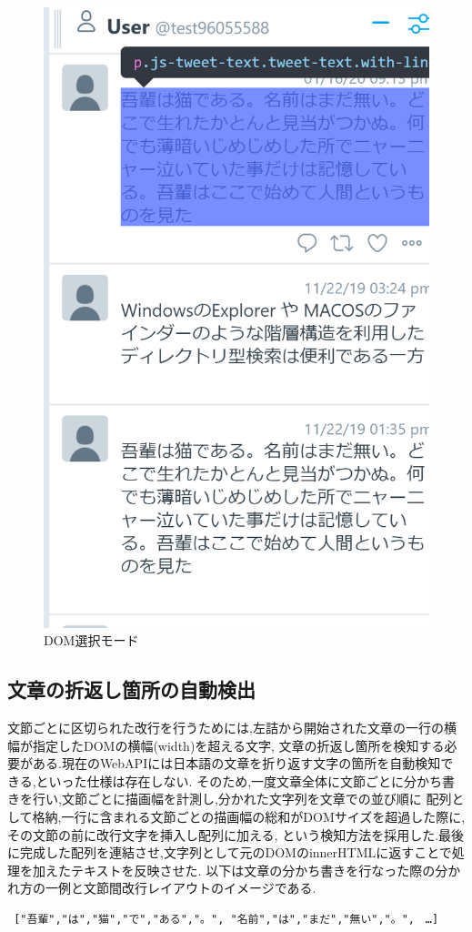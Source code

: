 \begin{figure}[H]
    \centering
    \label{fig:image10}
    \includegraphics[width=0.7\columnwidth]{image/03/img1.png}
    \caption[DOM選択モード] {DOM選択モード}
\end{figure}

\subsection{文章の折返し箇所の自動検出}
文節ごとに区切られた改行を行うためには,左詰から開始された文章の一行の横幅が指定したDOMの横幅(width)を超える文字,
文章の折返し箇所を検知する必要がある.現在のWebAPIには日本語の文章を折り返す文字の箇所を自動検知できる,といった仕様は存在しない.
そのため,一度文章全体に文節ごとに分かち書きを行い,文節ごとに描画幅を計測し,分かれた文字列を文章での並び順に
配列として格納,一行に含まれる文節ごとの描画幅の総和がDOMサイズを超過した際に,その文節の前に改行文字を挿入し配列に加える,
という検知方法を採用した.最後に完成した配列を連結させ,文字列として元のDOMのinnerHTMLに返すことで処理を加えたテキストを反映させた.
以下は文章の分かち書きを行なった際の分かれ方の一例と文節間改行レイアウトのイメージである.

\begin{verbatim} ["吾輩","は","猫","で","ある","。", "名前","は","まだ","無い","。",　…]
\end{verbatim}

